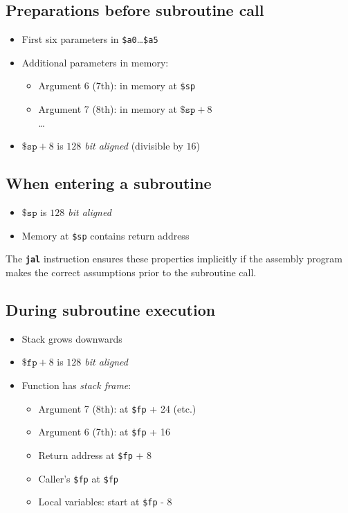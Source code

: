 \documentclass{article}
\newcommand{\insn}[1]{\texttt{\textbf{\textcolor{dblue}{#1}}}}
\begin{document}
\subsection{Preparations before subroutine call}
  \begin{itemize}
    \item First six parameters in \texttt{\$a0}\ldots\texttt{\$a5}
    \item Additional parameters in memory:
      \begin{itemize}
        \item Argument 6 (7th): in memory at \texttt{\$sp}
        \item Argument 7 (8th): in memory at $\texttt{\$sp} + 8$\\
          \ldots
      \end{itemize}
    \item $\texttt{\$sp} + 8$ is \emph{$128$ bit aligned} (divisible by $16$)
  \end{itemize}

\subsection{When entering a subroutine}
    \begin{itemize}
    \item $\texttt{\$sp}$ is \emph{$128$ bit aligned}
    \item Memory at \texttt{\$sp} contains return address
    \end{itemize}

    The \insn{jal} instruction ensures these properties implicitly if the assembly
    program makes the correct assumptions prior to the subroutine call.

\subsection{During subroutine execution}
\begin{itemize}
    \item Stack grows downwards
    \item $\texttt{\$fp} + 8$ is \emph{$128$ bit aligned}
    \item Function has \emph{stack frame}:
      \begin{itemize}
        \item Argument 7 (8th): at \texttt{\$fp} + 24 (etc.)
        \item Argument 6 (7th): at \texttt{\$fp} + 16
        \item Return address at \texttt{\$fp} + 8
        \item Caller's \texttt{\$fp} at \texttt{\$fp}
        \item Local variables: start at \texttt{\$fp} - 8
      \end{itemize}
    \end{itemize}
\end{document}
